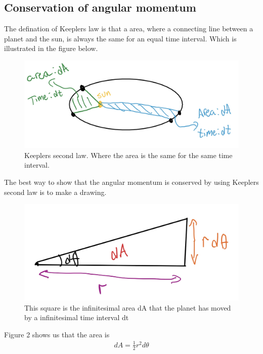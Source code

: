 \documentclass[norsk,a4paper,12pt]{article}
\begin{document}
\subsection{Conservation of angular momentum}
The defination of Keeplers law is that a area, where a connecting line between a planet and the sun, is always the same for an equal time interval. Which is illustrated in the figure below.
\begin{figure}[H]
	\centering
	\includegraphics[width=\linewidth]{K2L.jpg}
	\caption{Keeplers second law. Where the area is the same for the same time interval.}
	\label{fig:1bplot}
\end{figure}
The best way to show that the angular momentum is conserved by using Keeplers second law is to make a drawing.
\begin{figure}[H]
	\centering
	\includegraphics[width=\linewidth]{sketch.jpg}
	\caption{This square is the infinitesimal area dA that the planet has moved by a infinitesimal time interval dt}
	\label{fig:1bplot}
\end{figure}
Figure 2 shows us that the area is 
\begin{align}
    dA=\frac{1}{2}r^2d\theta
\end{align}
\end{document}
